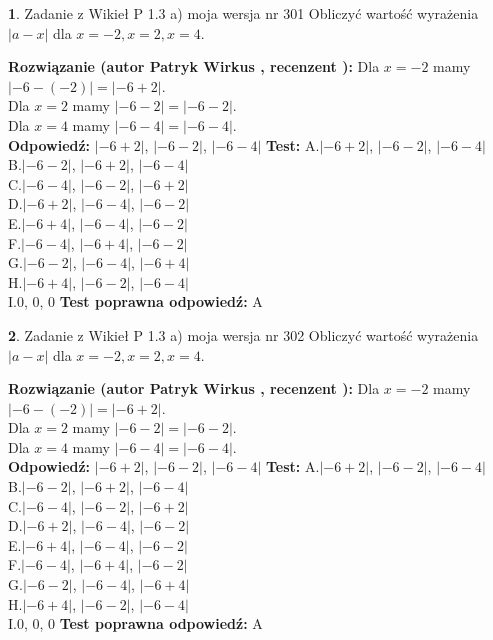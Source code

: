 \documentclass[12pt, a4paper]{article}
\theoremstyle{definition} %
\newtheorem{zad}{}
\newcommand{\zadStart}[1]{\begin{zad}#1\newline}
\newcommand{\zadStop}{\end{zad}}
\newcommand{\rozwStart}[2]{\noindent \textbf{Rozwiązanie (autor #1 , recenzent #2): }\newline}
\newcommand{\rozwStop}{\newline}
\newcommand{\odpStart}{\noindent \textbf{Odpowiedź:}\newline}
\newcommand{\odpStop}{\newline}
\newcommand{\testStart}{\noindent \textbf{Test:}\newline}
\newcommand{\testStop}{\newline}
\newcommand{\kluczStart}{\noindent \textbf{Test poprawna odpowiedź:}\newline}
\newcommand{\kluczStop}{\newline}
\begin{document}
\zadStart{Zadanie z Wikieł P 1.3 a) moja wersja nr 301}
Obliczyć wartość wyrażenia $|a - x|$ dla $x=-2,x=2,x=4$.
\zadStop
\rozwStart{Patryk Wirkus}{}
Dla $x = -2$ mamy $|-6 - (-2)| = |-6 + 2|$.\\
Dla $x = 2$ mamy $|-6 - 2| = |-6 - 2|$.\\
Dla $x = 4$ mamy $|-6 - 4| = |-6 - 4|$.\\
\rozwStop
\odpStart
$|-6 + 2|$, $|-6 - 2|$, $|-6 - 4|$
\odpStop
\testStart
A.$|-6 + 2|$, $|-6 - 2|$, $|-6 - 4|$\\
B.$|-6 - 2|$, $|-6 + 2|$, $|-6 - 4|$\\
C.$|-6 - 4|$, $|-6 - 2|$, $|-6 + 2|$\\
D.$|-6 + 2|$, $|-6 - 4|$, $|-6 - 2|$\\
E.$|-6 + 4|$, $|-6 - 4|$, $|-6 - 2|$\\
F.$|-6 - 4|$, $|-6 + 4|$, $|-6 - 2|$\\
G.$|-6 - 2|$, $|-6 - 4|$, $|-6 + 4|$\\
H.$|-6 + 4|$, $|-6 - 2|$, $|-6 - 4|$\\
I.$0$, $0$, $0$
\testStop
\kluczStart
A
\kluczStop



\zadStart{Zadanie z Wikieł P 1.3 a) moja wersja nr 302}
Obliczyć wartość wyrażenia $|a - x|$ dla $x=-2,x=2,x=4$.
\zadStop
\rozwStart{Patryk Wirkus}{}
Dla $x = -2$ mamy $|-6 - (-2)| = |-6 + 2|$.\\
Dla $x = 2$ mamy $|-6 - 2| = |-6 - 2|$.\\
Dla $x = 4$ mamy $|-6 - 4| = |-6 - 4|$.\\
\rozwStop
\odpStart
$|-6 + 2|$, $|-6 - 2|$, $|-6 - 4|$
\odpStop
\testStart
A.$|-6 + 2|$, $|-6 - 2|$, $|-6 - 4|$\\
B.$|-6 - 2|$, $|-6 + 2|$, $|-6 - 4|$\\
C.$|-6 - 4|$, $|-6 - 2|$, $|-6 + 2|$\\
D.$|-6 + 2|$, $|-6 - 4|$, $|-6 - 2|$\\
E.$|-6 + 4|$, $|-6 - 4|$, $|-6 - 2|$\\
F.$|-6 - 4|$, $|-6 + 4|$, $|-6 - 2|$\\
G.$|-6 - 2|$, $|-6 - 4|$, $|-6 + 4|$\\
H.$|-6 + 4|$, $|-6 - 2|$, $|-6 - 4|$\\
I.$0$, $0$, $0$
\testStop
\kluczStart
A
\kluczStop
\end{document}
